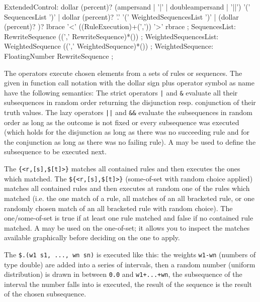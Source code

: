 \begin{rail} 
  ExtendedControl: 
	dollar (percent)? (ampersand | '|' | doubleampersand | '||') '(' SequencesList ')' |
	dollar (percent)? '.' '(' WeightedSequencesList ')' |
	(dollar (percent)? )? lbrace '<' ((RuleExecution)+(',')) '>' rbrace
	;
  SequencesList:
	RewriteSequence ((',' RewriteSequence)*())
	;
  WeightedSequencesList:
	WeightedSequence ((',' WeightedSequence)*())
	;
  WeightedSequence:
	FloatingNumber RewriteSequence
	;
\end{rail}

The  operators execute chosen elements from a sets of rules or sequences.
The  given in function call notation with the dollar sign plus operator symbol as name have the following semantics:
The strict operators \verb/|/ and \verb/&/ evaluate all their subsequences in random order returning the disjunction resp. conjunction of their truth values.
The lazy operators \verb/||/ and \verb/&&/ evaluate the subsequences in random order as long as the outcome is not fixed or every subsequence was executed 
(which holds for the disjunction as long as there was no succeeding rule and for the conjunction as long as there was no failing rule).
A  may be used to define the subsequence to be executed next.

The  \verb/{<r,[s],$[t]>}/ matches all contained rules and then executes the ones which matched.
The  \verb/${<r,[s],$[t]>}/ (some-of-set with random choice applied) matches all contained rules and then executes at random one of the rules which matched
(i.e. the one match of a rule, all matches of an all bracketed rule, or one randomly chosen match of an all bracketed rule with random choice).
The one/some-of-set is true if at least one rule matched and false if no contained rule matched.
A  may be used on the one-of-set; it allows you to inspect the matches available graphically before deciding on the one to apply. 

The  \verb/$.(w1 s1, ..., wn sn)/ is executed like this:
the weights \texttt{w1-wn} (numbers of type double) are added into a series of intervals,
then a random number (uniform distribution) is drawn in between \texttt{0.0} and \texttt{w1+...+wn},
the subsequence of the interval the number falls into is executed,
the result of the sequence is the result of the chosen subsequence.



